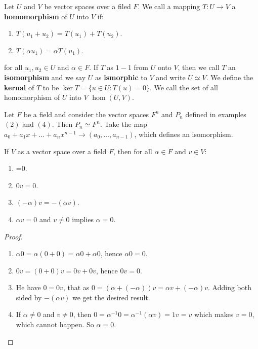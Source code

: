 \begin{definition}
    Let $U$ and  $V$ be vector spaces over a filed  $F$. We call a mapping  $T:U
    \rightarrow V$ a \textbf{homomorphism} of $U$ into  $V$ if: 
        \begin{enumerate}[label=(\arabic*)]
            \item $T(u_1+u_2)=T(u_1)+T(u_2)$.

            \item $T(\alpha u_1)=\alpha T(u_1)$.
        \end{enumerate}
    for all $ u_1,u_2 \in U$ and $\alpha \in F$. If  $T$ as  $1-1$ from  $U$
    onto  $V$, then we call  $T$ an \textbf{isomorphism} and we say $U$ as
    \textbf{ismorphic} to $V$ and write  $U \simeq V$. We define the
    \textbf{kernal} of $T$ to be  $\ker{T}=\{u \in U: T(u)=0\}$. We call the set
    of all homomorphism of $U$ into  $V$  $\hom(U,V)$.
\end{definition}

\begin{example}
    Let $F$ be a field and consider the vector spaces  $F^n$ and  $P_n$ defined
    in examples $(2)$ and $(4)$. Then $P_n \simeq F^n$. Take the map  $
    a_0+a_1x+\dots+a_nx^{n-1} \rightarrow (a_0, \dots, a_{n-1})$, which defines
    an isomorphism.
\end{example}

\begin{lemma}\label{1.1.3}
    If $V$ as a vector space over a field  $F$, then for all  $\alpha \in F$ and
     $v \in V$:
        \begin{enumerate}[label=(\arabic*)]
            \item {}=0.

            \item $0v=0$.

            \item $(-\alpha)v=-(\alpha v)$.

            \item $\alpha v=0$ and $v \neq 0$ implies $\alpha=0$.
        \end{enumerate}
\end{lemma}
\begin{proof}
    \begin{enumerate}[label=(\arabic*)]
        \item $\alpha0=\alpha(0+0)=\alpha0+\alpha0$, hence $\alpha0=0$.

        \item $0v=(0+0)v=0v+0v$, hence $0v=0$.

        \item He have $0=0v$, that as $0=(\alpha+(-\alpha))v=\alpha
            v+(-\alpha)v$. Adding both sided by $-(\alpha v)$ we get the desired
            result.

        \item If  $\alpha \neq 0$ and $v \neq 0$, then $0=\alpha^{-1}0=\alpha^{-1}(\alpha v)=1v=v$
            which makes $v=0$, which cannot happen. So $\alpha=0$.
    \end{enumerate}
\end{proof}

